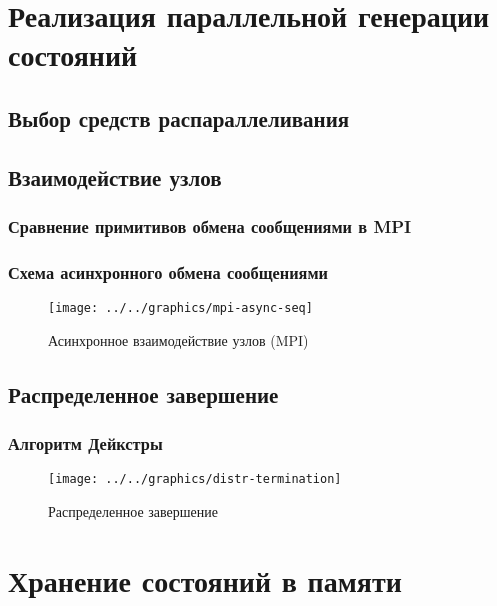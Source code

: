 \chapter{Реализация параллельной генерации состояний}
\label{cha:parmpi}

\section{Выбор средств распараллеливания}
\label{sec:paral-selection}

\section{Взаимодействие узлов}
\label{sec:mpi-interaction}

\subsection{Сравнение примитивов обмена сообщениями в MPI}
\label{sec:mpi-primitives}

\subsection{Схема асинхронного обмена сообщениями}
\label{sec:async-mpi-queue}

\begin{figure}[ht]
  \centering
  \texttt{[image: ../../graphics/mpi-async-seq]}  
  \caption{Асинхронное взаимодействие узлов (MPI)}
  \label{fig:mpi-async-seq}
\end{figure}

\section{Распределенное завершение}
\label{sec:distributed-termination}

\subsection{Алгоритм Дейкстры}
\label{sec:distr-term-dijkstra}

\begin{figure}[ht]
  \centering
  \texttt{[image: ../../graphics/distr-termination]}  
  \caption{Распределенное завершение}
\label{fig:dist-term}
\end{figure}

\chapter{Хранение состояний в памяти}
\label{cha:state-store}

